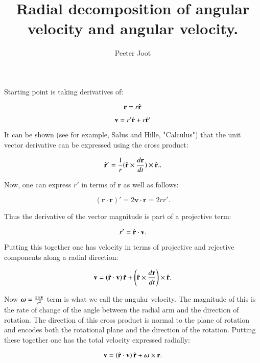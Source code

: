\documentclass{article}      %
\title{ Radial decomposition of angular velocity and angular velocity.} %
\author{Peeter Joot}         %
\begin{document}

\maketitle{}

\section{}

Starting point is taking derivatives of:

\[
\mathbf{r} = r \hat{\mathbf{r}}
\]

\[
\mathbf{v} = r' \hat{\mathbf{r}} + r \hat{\mathbf{r}}'
\]

It can be shown (see for example, Salus and Hille, "Calculus") that the unit vector derivative can be expressed using the cross product:

\[
\hat{\mathbf{r}}' = \frac{1}{r} (\hat{\mathbf{r}} \times \frac{d\mathbf{r}}{dt}) \times \hat{\mathbf{r}}..
\]

Now, one can express $r'$ in terms of $\mathbf{r}$ as well as follows:

\[
\left(\mathbf{r} \cdot \mathbf{r}\right)' = 2 \mathbf{v} \cdot \mathbf{r} = 2 r r'.
\]

Thus the derivative of the vector magnitude is part of a projective term:

\[
r' = \hat{\mathbf{r}} \cdot \mathbf{v}.
\]

Putting this together one has velocity in terms of projective and rejective
components along a radial direction:

\[
\mathbf{v} = \left(\hat{\mathbf{r}} \cdot \mathbf{v}\right) \hat{\mathbf{r}} + \left(\hat{\mathbf{r}} \times \frac{d\mathbf{r}}{dt}\right) \times \hat{\mathbf{r}}.
\]

Now $\boldsymbol{\omega} = \frac{\mathbf{r} \times \mathbf{v}}{r^2}$ term is what we call the angular velocity.  The magnitude of this
is the rate of change of the angle between the radial arm and the direction of rotation.  The direction of this
cross product is normal to the plane of rotation and encodes both the rotational plane and the direction of the
rotation.  Putting these together one has the total velocity expressed radially:

\[
\mathbf{v} = \left(\hat{\mathbf{r}} \cdot \mathbf{v}\right) \hat{\mathbf{r}} + \boldsymbol{\omega} \times \mathbf{r}.
\]
\end{document}
